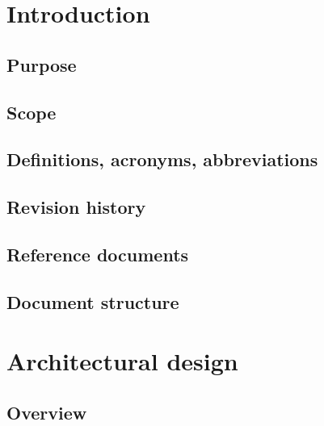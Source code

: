 \documentclass[10pt,english, openany]{book}
\begin{document}
\chapter{Introduction}\label{chapt:sum}

\section{Purpose}



\section{Scope}



\section{Definitions, acronyms, abbreviations}



\section{Revision history}



\section{Reference documents}



\section{Document structure}



\chapter{Architectural design}

\section{Overview}
\end{document}
